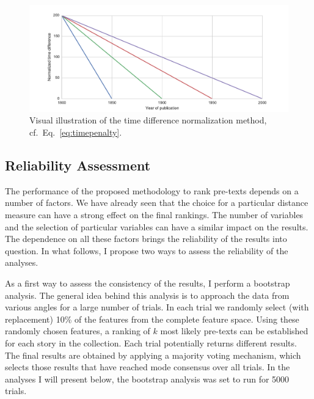 \begin{figure}
\centering
\includegraphics[width=\textwidth]{images/timepenalty}
\caption{Visual illustration of the time difference normalization method, cf.\ Eq.~\ref{eq:timepenalty}.}
\label{fig:time-penalty}
\end{figure}

\subsection{Reliability Assessment}
The performance of the proposed methodology to rank pre-texts depends on a number of factors. We have already seen that the choice for a particular distance measure can have a strong effect on the final rankings. The number of variables and the selection of particular variables can have a similar impact on the results. The dependence on all these factors brings the reliability of the results into question. In what follows, I propose two ways to assess the reliability of the analyses.

As a first way to assess the consistency of the results, I perform a bootstrap analysis. The general idea behind this analysis is to approach the data from various angles for a large number of trials. In each trial we randomly select (with replacement) 10\% of the features from the complete feature space. Using these randomly chosen features, a ranking of $k$ most likely pre-texts can be established for each story in the collection. Each trial potentially returns different results. The final results are obtained by applying a majority voting mechanism, which selects those results that have reached mode consensus over all trials. In the analyses I will present below, the bootstrap analysis was set to run for 5000 trials\autocite[For more information about the bootstrap procedure, see][]{good:2006}.


